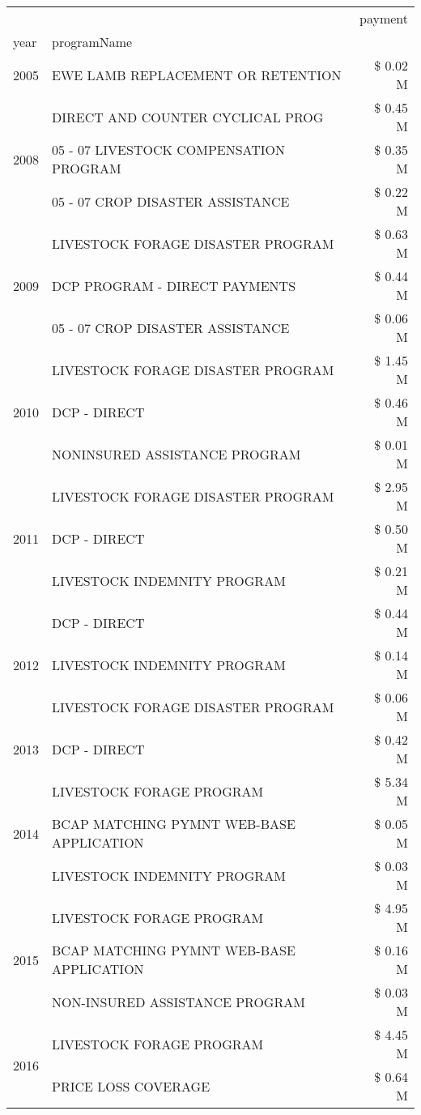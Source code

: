 \begin{tabular}{llr}
\toprule
 &  & payment \\
year & programName &  \\
\midrule
2005 & EWE LAMB REPLACEMENT OR RETENTION & \$ 0.02 M \\
\cline{1-3}
\multirow[t]{3}{*}{2008} & DIRECT AND COUNTER CYCLICAL PROG & \$ 0.45 M \\
 & 05 - 07 LIVESTOCK COMPENSATION PROGRAM & \$ 0.35 M \\
 & 05 - 07 CROP DISASTER ASSISTANCE & \$ 0.22 M \\
\cline{1-3}
\multirow[t]{3}{*}{2009} & LIVESTOCK FORAGE DISASTER  PROGRAM & \$ 0.63 M \\
 & DCP PROGRAM - DIRECT PAYMENTS & \$ 0.44 M \\
 & 05 - 07 CROP DISASTER ASSISTANCE & \$ 0.06 M \\
\cline{1-3}
\multirow[t]{3}{*}{2010} & LIVESTOCK FORAGE DISASTER PROGRAM & \$ 1.45 M \\
 & DCP - DIRECT & \$ 0.46 M \\
 & NONINSURED ASSISTANCE PROGRAM & \$ 0.01 M \\
\cline{1-3}
\multirow[t]{3}{*}{2011} & LIVESTOCK FORAGE DISASTER PROGRAM & \$ 2.95 M \\
 & DCP - DIRECT & \$ 0.50 M \\
 & LIVESTOCK INDEMNITY PROGRAM & \$ 0.21 M \\
\cline{1-3}
\multirow[t]{3}{*}{2012} & DCP - DIRECT & \$ 0.44 M \\
 & LIVESTOCK INDEMNITY PROGRAM & \$ 0.14 M \\
 & LIVESTOCK FORAGE DISASTER PROGRAM & \$ 0.06 M \\
\cline{1-3}
2013 & DCP - DIRECT & \$ 0.42 M \\
\cline{1-3}
\multirow[t]{3}{*}{2014} & LIVESTOCK FORAGE PROGRAM & \$ 5.34 M \\
 & BCAP MATCHING PYMNT WEB-BASE APPLICATION & \$ 0.05 M \\
 & LIVESTOCK INDEMNITY PROGRAM & \$ 0.03 M \\
\cline{1-3}
\multirow[t]{3}{*}{2015} & LIVESTOCK FORAGE PROGRAM & \$ 4.95 M \\
 & BCAP MATCHING PYMNT WEB-BASE APPLICATION & \$ 0.16 M \\
 & NON-INSURED ASSISTANCE PROGRAM & \$ 0.03 M \\
\cline{1-3}
\multirow[t]{3}{*}{2016} & LIVESTOCK FORAGE PROGRAM & \$ 4.45 M \\
 & PRICE LOSS COVERAGE & \$ 0.64 M \\

\end{tabular}
